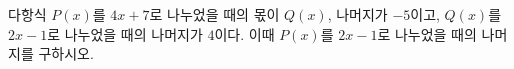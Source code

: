 다항식 $P(x)$를 $4x+7$로 나누었을 때의 몫이 $Q(x)$, 나머지가 $-5$이고, $Q(x)$를 $2x-1$로 나누었을 때의 나머지가 $4$이다. 이때 $P(x)$를 $2x-1$로 나누었을 때의 나머지를 구하시오.

